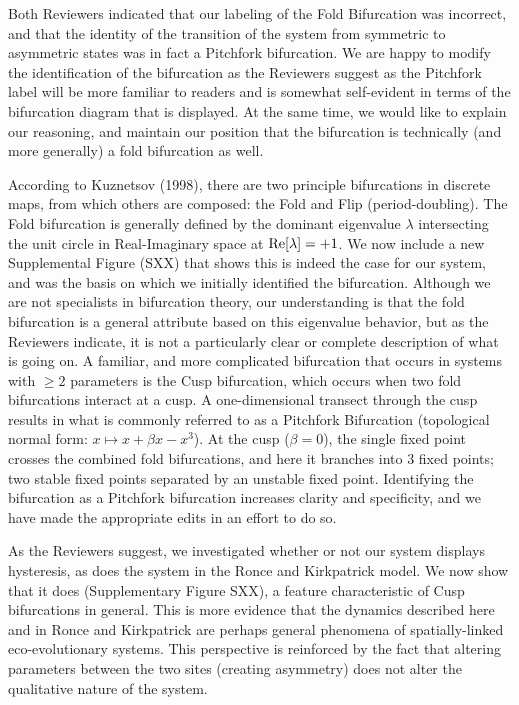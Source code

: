 \documentclass[ucm,12pt]{ucletter}
\begin{document}
\begin{letter}
 Both Reviewers indicated that our labeling of the Fold Bifurcation was incorrect, and that the identity of the transition of the system from symmetric to asymmetric states was in fact a Pitchfork bifurcation. We are happy to modify the identification of the bifurcation as the Reviewers suggest as the Pitchfork label will be more familiar to readers and is somewhat self-evident in terms of the bifurcation diagram that is displayed. At the same time, we would like to explain our reasoning, and maintain our position that the bifurcation is technically (and more generally) a fold bifurcation as well.

According to Kuznetsov (1998), there are two principle bifurcations in discrete maps, from which others are composed: the Fold and Flip (period-doubling).
The Fold bifurcation is generally defined by the dominant eigenvalue $\lambda$ intersecting the unit circle in Real-Imaginary space at ${\rm Re}[\lambda]=+1$.
We now include a new Supplemental Figure (SXX) that shows this is indeed the case for our system, and was the basis on which we initially identified the bifurcation. Although we are not specialists in bifurcation theory, our understanding is that the fold bifurcation is a general attribute based on this eigenvalue behavior, but as the Reviewers indicate, it is not a particularly clear or complete description of what is going on. 
A familiar, and more complicated bifurcation that occurs in systems with $\geq2$ parameters is the Cusp bifurcation, which occurs when two fold bifurcations interact at a cusp.
A one-dimensional transect through the cusp results in what is commonly referred to as a Pitchfork Bifurcation (topological normal form: $x \mapsto x + \beta x - x^3$). At the cusp ($\beta=0$), the single fixed point crosses the combined fold bifurcations, and here it branches into 3 fixed points; two stable fixed points separated by an unstable fixed point.
Identifying the bifurcation as a Pitchfork bifurcation increases clarity and specificity, and we have made the appropriate edits in an effort to do so.


As the Reviewers suggest, we investigated whether or not our system displays hysteresis, as does the system in the Ronce and Kirkpatrick model.
We now show that it does (Supplementary Figure SXX), a feature characteristic of Cusp bifurcations in general.
This is more evidence that the dynamics described here and in Ronce and Kirkpatrick are perhaps general phenomena of spatially-linked eco-evolutionary systems.
This perspective is reinforced by the fact that altering parameters between the two sites (creating asymmetry) does not alter the qualitative nature of the system.


\end{letter}
\end{document}
